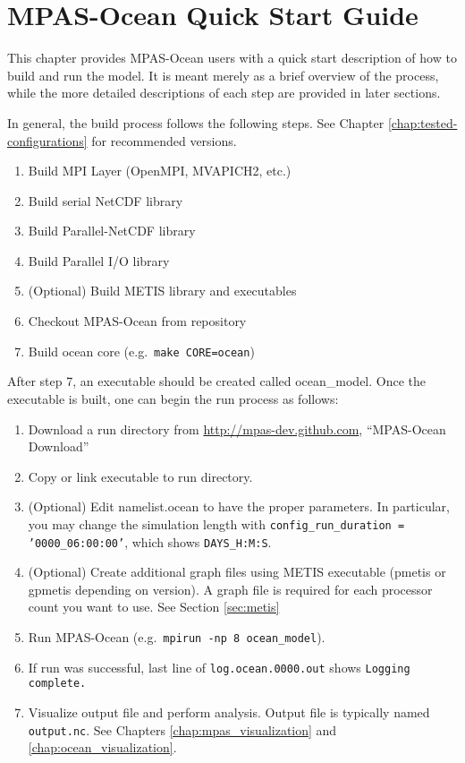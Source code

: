 \chapter{MPAS-Ocean Quick Start Guide}
\label{chap:quick_start}

This chapter provides MPAS-Ocean users with a quick start description of how to
build and run the model. It is meant merely as a brief overview of the process,
while the more detailed descriptions of each step are provided in later
sections.

In general, the build process follows the following steps.  See Chapter 
\ref{chap:tested-configurations} for recommended versions.

\begin{enumerate}
	\item Build MPI Layer (OpenMPI, MVAPICH2, etc.)
	\item Build serial NetCDF library
	\item Build Parallel-NetCDF library
	\item Build Parallel I/O library
	\item (Optional) Build METIS library and executables
	\item Checkout MPAS-Ocean from repository
	\item Build ocean core (e.g.\ {\tt make CORE=ocean})
\end{enumerate}

After step 7, an executable should be created called ocean\_model. Once the executable is built, one can begin the run process as follows:

\begin{enumerate}
	\item Download a run directory from \url{http://mpas-dev.github.com}, ``MPAS-Ocean Download''
	\item Copy or link executable to run directory.
	\item (Optional) Edit namelist.ocean to have the proper parameters. In particular, you may change the simulation length with {\tt config\_run\_duration = '0000\_06:00:00'}, which shows {\tt DAYS\_H:M:S}.
	\item (Optional) Create additional graph files using METIS executable (pmetis or gpmetis depending on version).  A graph file is required for each processor count you want to use.  See Section \ref{sec:metis}
	\item Run MPAS-Ocean (e.g.\ {\tt mpirun -np 8 ocean\_model}).
	\item If run was successful, last line of {\tt log.ocean.0000.out} shows {\tt Logging complete.}
	\item Visualize output file and perform analysis.  Output file is typically named {\tt output.nc}.  See Chapters \ref{chap:mpas_visualization} and \ref{chap:ocean_visualization}.
\end{enumerate}
